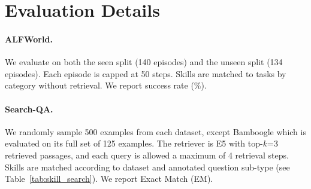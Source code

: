 \section{Evaluation Details}
\label{app:eval}

\paragraph{ALFWorld.} We evaluate on both the seen split (140 episodes) and the unseen split (134 episodes). Each episode is capped at 50 steps. Skills are matched to tasks by category without retrieval. We report success rate (\%).

\paragraph{Search-QA.} We randomly sample 500 examples from each dataset, except Bamboogle which is evaluated on its full set of 125 examples. The retriever is E5 with top-$k$=3 retrieved passages, and each query is allowed a maximum of 4 retrieval steps. Skills are matched according to dataset and annotated question sub-type (see Table~\ref{tab:skill_search}). We report Exact Match (EM).
